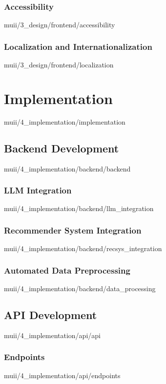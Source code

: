 \documentclass[english,epsbased,copyright,final,printable,covers,extendedindex,firstnumbered,tfm,gnuplot,loc,loe,lof,lot]{tfgtfmthesisuam}
\begin{document}
      \subsection{Accessibility\label{SS:ACCESSIBILITY}}{muii/3_design/frontend/accessibility}
      \subsection{Localization and Internationalization\label{SS:LOCALINTER}}{muii/3_design/frontend/localization}

  \chapter{Implementation\label{CAP:IMPLEMENTATION}}{muii/4_implementation/implementation}
    \section{Backend Development\label{SEC:BACKDEV}}{muii/4_implementation/backend/backend}
      \subsection{LLM Integration\label{SS:LLMINTEG}}{muii/4_implementation/backend/llm_integration}
      \subsection{Recommender System Integration\label{SS:RECSYSINTEG}}{muii/4_implementation/backend/recsys_integration}
      \subsection{Automated Data Preprocessing\label{SS:AUTODATAPREPROC}}{muii/4_implementation/backend/data_processing}

    \section{API Development\label{SEC:APIDEV}}{muii/4_implementation/api/api}
      \subsection{Endpoints\label{SS:ENDPOINTS}}{muii/4_implementation/api/endpoints}
\end{document}
